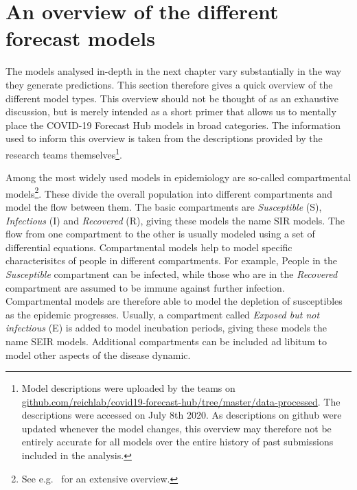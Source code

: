 \documentclass[
]{book}
\begin{document}
\hypertarget{an-overview-of-the-different-forecast-models}{%
\section{An overview of the different forecast models}\label{an-overview-of-the-different-forecast-models}}

The models analysed in-depth in the next chapter vary substantially in the way they generate predictions. This section therefore gives a quick overview of the different model types. This overview should not be thought of as an exhaustive discussion, but is merely intended as a short primer that allows us to mentally place the COVID-19 Forecast Hub models in broad categories. The information used to inform this overview is taken from the descriptions provided by the research teams themselves\footnote{Model descriptions were uploaded by the teams on \href{https://github.com/reichlab/covid19-forecast-hub/tree/master/data-processed}{github.com/reichlab/covid19-forecast-hub/tree/master/data-processed}. The descriptions were accessed on July 8th 2020. As descriptions on github were updated whenever the model changes, this overview may therefore not be entirely accurate for all models over the entire history of past submissions included in the analysis.}.

Among the most widely used models in epidemiology are so-called compartmental models\footnote{See e.g.~\citet{brauerCompartmentalModelsEpidemiology2008} for an extensive overview.}. These divide the overall population into different compartments and model the flow between them. The basic compartments are \emph{Susceptible} (S), \emph{Infectious} (I) and \emph{Recovered} (R), giving these models the name SIR models. The flow from one compartment to the other is usually modeled using a set of differential equations. Compartmental models help to model specific characterisitcs of people in different compartments. For example, People in the \emph{Susceptible} compartment can be infected, while those who are in the \emph{Recovered} compartment are assumed to be immune against further infection. Compartmental models are therefore able to model the depletion of susceptibles as the epidemic progresses. Usually, a compartment called \emph{Exposed but not infectious} (E) is added to model incubation periods, giving these models the name SEIR models. Additional compartments can be included ad libitum to model other aspects of the disease dynamic.
\end{document}
